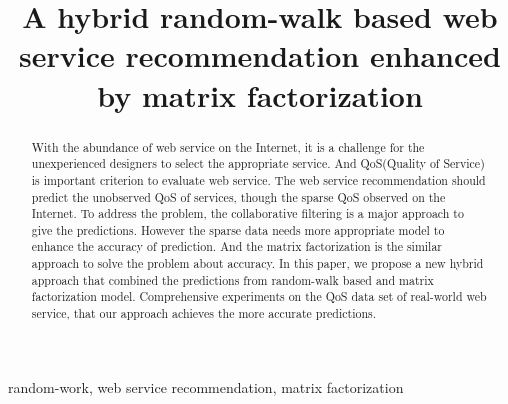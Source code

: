 \documentclass[conference]{IEEEtran}
\begin{document}
\title{A hybrid random-walk based web service recommendation enhanced by matrix factorization}

\author{
  \and
}

\maketitle

\begin{abstract}
With the abundance of web service on the Internet, it is a challenge for the unexperienced designers to select the appropriate service. And QoS(Quality of Service) is important criterion to evaluate web service. The web service recommendation should predict the unobserved QoS of services, though the sparse QoS observed on the Internet. To address the problem, the collaborative filtering is a major approach to give the predictions. However the sparse data needs more appropriate model to enhance the accuracy of prediction. And the matrix factorization is the similar approach to solve the problem about accuracy. In this paper, we propose a new hybrid approach that combined the predictions from random-walk based and matrix factorization model. Comprehensive experiments on the QoS data set of real-world web service, that our approach achieves the more accurate predictions.
\end{abstract}

\begin{IEEEkeywords}
  random-work, web service recommendation, matrix factorization
\end{IEEEkeywords}

\IEEEpeerreviewmaketitle

\end{document}
